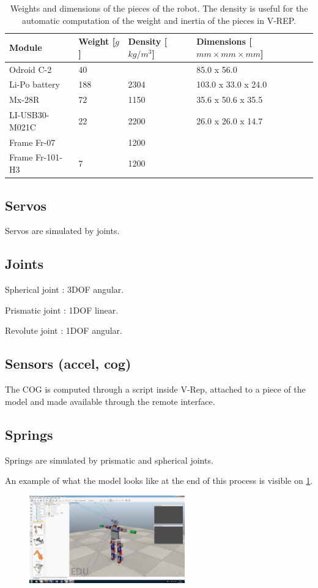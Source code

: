 \begin{table}[htp]
\center
\begin{tabularx}{\textwidth}{@{} X X X l @{}}
\toprule
\textbf{Module} & \textbf{Weight [$g$]} &  \textbf{Density [$kg/m^3$]}& \textbf{Dimensions [$mm \times mm \times mm$]}\\ 
\midrule
Odroid C-2 & 40 &  & 85.0 x 56.0\\
Li-Po battery & 188 & 2304 & 103.0 x 33.0 x 24.0\\
Mx-28R & 72 & 1150 & 35.6 x 50.6 x 35.5\\
LI-USB30-M021C & 22 & 2200 & 26.0 x 26.0 x 14.7\\
Frame Fr-07 & & 1200 & \\
Frame Fr-101-H3 & 7 & 1200 & \\
\bottomrule
\end{tabularx}
\caption[Weights and dimensions of the pieces of the robot]{Weights and dimensions of the pieces of the robot. The density is useful for the automatic computation of the weight and inertia of the pieces in V-REP.}
\label{table:weights}
\end{table}

\subsection{Servos}
Servos are simulated by joints.

\subsection{Joints}
Spherical joint : 3DOF angular.

Prismatic joint : 1DOF linear.

Revolute joint : 1DOF angular.

\subsection{Sensors (accel, cog)}
The COG is computed through a script inside V-Rep, attached to a piece of the model and made available through the remote interface\cite{vrep_manual}.

\subsection{Springs}
Springs are simulated by prismatic and spherical joints.

An example of what the model looks like at the end of this process is visible on \cref{fig:modelling_vrep}.
\begin{figure}[htp]
\center
    \includegraphics[width = 0.6\textwidth]{figures/modelling_vrep}
    \caption{}
    \label{fig:modelling_vrep}
\end{figure}